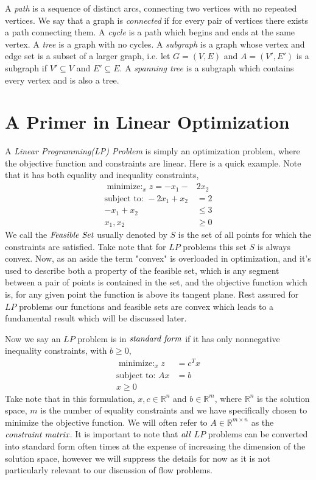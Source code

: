\documentclass[12pt]{amsart}
\newcommand{\RR}{\mathbb{R}}
\begin{document}
A \emph{path} is a sequence of distinct arcs, connecting two vertices with no repeated vertices. We say that a graph is \emph{connected} if 
for every pair of vertices there exists a path connecting them. A \emph{cycle} is a path which begins and ends at the same vertex. A \emph{tree}
is a graph with no cycles. A \emph{subgraph} is a graph whose vertex and edge set is a subset of a larger graph, i.e. let $G = (V, E)$
and $A = (V', E')$ is a subgraph if $V'\subseteq V$ and $E'\subseteq E$. A \emph{spanning tree} is a subgraph which contains every vertex and is also a tree. 



\section{A Primer in Linear Optimization}
A \emph{Linear Programming(LP) Problem} is simply an optimization problem, where the objective function and constraints are linear. Here is a quick example. Note that it has both equality and inequality constraints, 
    \begin{align*}
        \mathop{\text{minimize: }}_{x}  z = -x_1  - &2x_2\\
      \text{subject to: } -2x_1 + x_2 &= 2\\
      -x_1 + x_2 &\leq 3\\
      x_1, x_2 &\geq 0
    \end{align*}
    We call the $\emph{Feasible Set}$ usually denoted by $S$ is the set of all points for which the constraints are satisfied. Take note that for $LP$ problems this set $S$ is always convex. Now, as an aside the term "convex" is overloaded in optimization, and it's used to describe both a property of the feasible set, which is any segment between a pair of points is contained in the set, and the objective function which is, for any given point the function is above its tangent plane. Rest assured for $LP$ problems our functions and feasible sets are convex which leads to a fundamental result which will be discussed later.    
    
    
    
    Now we say an $LP$ problem is in $\emph{standard form}$ if it has only nonnegative inequality constraints, with $b \geq 0$,
    \begin{align*}
        \mathop{\text{minimize: }}_{x}  z &= c^Tx\\
      \text{subject to: }Ax &= b\\
      x \geq 0
    \end{align*}  
    Take note that in this formulation, $x, c \in \RR^n$ and $b \in \RR^m$, where $\RR^n$ is the solution space, $m$ is the number of equality constraints and we have specifically chosen to minimize the objective function. We will often refer to $A \in \RR^{m \times n}$ as the $\emph{constraint matrix}$. It is important to note that $\emph{all}$ $LP$ problems can be converted into standard form often times at the expense of increasing the dimension of the solution space, however we will suppress the details for now as it is not particularly relevant to our discussion of flow problems. \\
    
\end{document}
